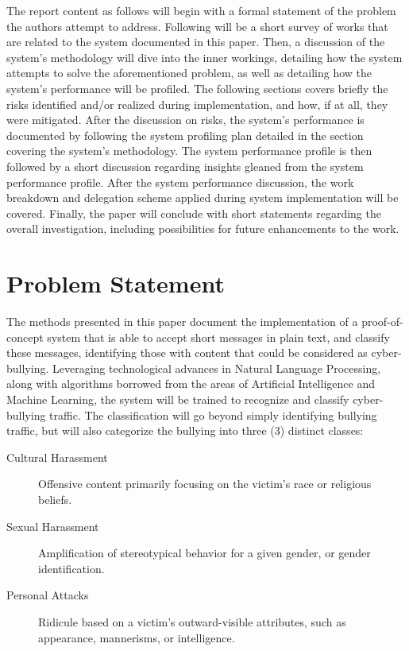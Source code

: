 \documentclass[conference]{sig-alternate-05-2015}
\begin{document}
The report content as follows will begin with a formal statement of the problem
the authors attempt to address. Following will be a short survey of works that
are related to the system documented in this paper. Then, a discussion of the
system's methodology will dive into the inner workings, detailing how the system
attempts to solve the aforementioned problem, as well as detailing how the
system's performance will be profiled. The following sections covers
briefly the risks identified and/or realized during implementation, and how, if
at all, they were mitigated. After the discussion on risks, the system's
performance is documented by following the system profiling plan detailed in
the section covering the system's methodology. The system performance profile is
then followed by a short discussion regarding insights gleaned from the system
performance profile. After the system performance discussion, the work breakdown
and delegation scheme applied during system implementation will be covered.
Finally, the paper will conclude with short statements regarding the overall
investigation, including possibilities for future enhancements to the work.

\section{Problem Statement}\label{sec:problem_statement}

The methods presented in this paper document the implementation of a
proof-of-concept system that is able to accept short messages in plain text,
and classify these messages, identifying those with content that could be
considered as cyber-bullying. Leveraging technological advances in Natural
Language Processing, along with algorithms borrowed from the areas of Artificial
Intelligence and Machine Learning, the system will be trained to recognize and
classify cyber-bullying traffic. The classification will go beyond simply
identifying bullying traffic, but will also categorize the bullying into three
(3) distinct classes:
\begin{description}
    \item[Cultural Harassment] Offensive content primarily focusing on the
    victim's race or religious beliefs.
    \item[Sexual Harassment] Amplification of stereotypical behavior for a given
    gender, or gender identification.
    \item[Personal Attacks] Ridicule based on a victim's outward-visible
    attributes, such as appearance, mannerisms, or intelligence.
\end{description}
\end{document}
